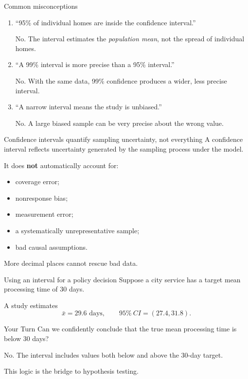 \documentclass[11pt,aspectratio=169]{beamer}
\newcommand{\yourturn}[1]{%
\begin{center}
\begin{minipage}{0.90\textwidth}
\begin{alertblock}{Your Turn}
#1
\end{alertblock}
\end{minipage}
\end{center}}
\begin{document}
\begin{frame}{Common misconceptions}
\begin{enumerate}
  \item \textcolor{midgray}{``95\% of individual homes are inside the confidence interval.''}
  
  \alert{No.} The interval estimates the \emph{population mean}, not the spread of individual homes.
  \vspace{0.5em}
  \item \textcolor{midgray}{``A 99\% interval is more precise than a 95\% interval.''}
  
  \alert{No.} With the same data, 99\% confidence produces a wider, less precise interval.
  \vspace{0.5em}
  \item \textcolor{midgray}{``A narrow interval means the study is unbiased.''}
  
  \alert{No.} A large biased sample can be very precise about the wrong value.
\end{enumerate}
\end{frame}

\begin{frame}{Confidence intervals quantify sampling uncertainty, not everything}
A confidence interval reflects uncertainty generated by the sampling process under the model.

It does \textbf{not} automatically account for:
\begin{itemize}
  \item coverage error;
  \item nonresponse bias;
  \item measurement error;
  \item a systematically unrepresentative sample;
  \item bad causal assumptions.
\end{itemize}

\vfill
\alert{More decimal places cannot rescue bad data.}
\end{frame}

\begin{frame}{Using an interval for a policy decision}
Suppose a city service has a target mean processing time of 30 days.

A study estimates
\[
\bar{x}=29.6\text{ days},\qquad 95\%\ CI=(27.4,31.8).
\]

\yourturn{Can we confidently conclude that the true mean processing time is below 30 days?}

\vspace{0.7em}
No. The interval includes values both below and above the 30-day target.

\vfill
This logic is the bridge to \alert{hypothesis testing}.
\end{frame}
\end{document}
